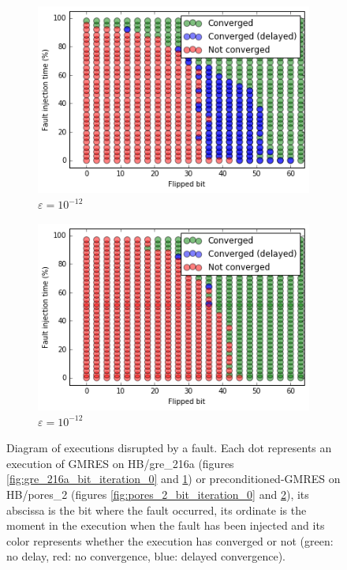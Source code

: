 \begin{figure}[ht]
  \begin{subfigure}[b]{0.5\linewidth}
    \centering
 	\includegraphics[width=\linewidth]{figures/gre_216a/bit_iteration_1.png} %
	\caption{$\varepsilon = 10^{-12}$}
    \label{fig:gre_216a_bit_iteration_1}	
  \end{subfigure}%
    \hspace{4ex}
  \begin{subfigure}[b]{0.5\linewidth}
    \centering
	 \includegraphics[width=\linewidth]{figures/pores_2/bit_iteration_1.png} %
	\caption{$\varepsilon = 10^{-12}$}
    \label{fig:pores_2_bit_iteration_1}	
  \end{subfigure} 
\caption{Diagram of executions disrupted by a fault. Each dot represents an execution of GMRES on HB/gre_216a (figures \ref{fig:gre_216a_bit_iteration_0} and \ref{fig:gre_216a_bit_iteration_1}) or preconditioned-GMRES on HB/pores_2 (figures \ref{fig:pores_2_bit_iteration_0} and \ref{fig:pores_2_bit_iteration_1}), its abscissa is the bit where the fault occurred, its ordinate is the moment in the execution when the fault has been injected and its color represents whether the execution has converged or not (green: no delay, red: no convergence, blue: delayed convergence).}
\label{fig:bit_iteration}
\end{figure}





